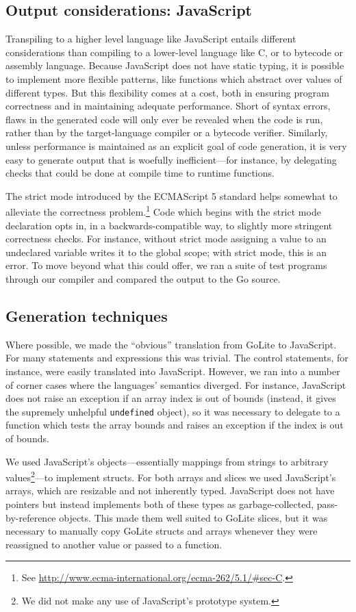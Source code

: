 \documentclass[oneside]{article}
\begin{document}
\subsection{Output considerations: JavaScript}
Transpiling to a higher level language like JavaScript entails different considerations than compiling to a lower-level language like C, or to bytecode or assembly language. Because JavaScript does not have static typing, it is possible to implement more flexible patterns, like functions which abstract over values of different types. But this flexibility comes at a cost, both in ensuring program correctness and in maintaining adequate performance. Short of syntax errors, flaws in the generated code will only ever be revealed when the code is run, rather than by the target-language compiler or a bytecode verifier. Similarly, unless performance is maintained as an explicit goal of code generation, it is very easy to generate output that is woefully inefficient---for instance, by delegating checks that could be done at compile time to runtime functions.

The strict mode introduced by the ECMAScript 5 standard helps somewhat to alleviate the correctness problem.\footnote{See \url{http://www.ecma-international.org/ecma-262/5.1/\#sec-C}.} Code which begins with the strict mode declaration opts in, in a backwards-compatible way, to slightly more stringent correctness checks. For instance, without strict mode assigning a value to an undeclared variable writes it to the global scope; with strict mode, this is an error. To move beyond what this could offer, we ran a suite of test programs through our compiler and compared the output to the Go source.

\subsection{Generation techniques}\label{subsec:gentech}
Where possible, we made the ``obvious'' translation from GoLite to JavaScript. For many statements and expressions this was trivial. The control statements, for instance, were easily translated into JavaScript. However, we ran into a number of corner cases where the languages' semantics diverged. For instance, JavaScript does not raise an exception if an array index is out of bounds (instead, it gives the supremely unhelpful \texttt{undefined} object), so it was necessary to delegate to a function which tests the array bounds and raises an exception if the index is out of bounds.

We used JavaScript's objects---essentially mappings from strings to arbitrary values\footnote{We did not make any use of JavaScript's prototype system.}---to implement structs. For both arrays and slices we used JavaScript's arrays, which are resizable and not inherently typed. JavaScript does not have pointers but instead implements both of these types as garbage-collected, pass-by-reference objects. This made them well suited to GoLite slices, but it was necessary to manually copy GoLite structs and arrays whenever they were reassigned to another value or passed to a function.
\end{document}
